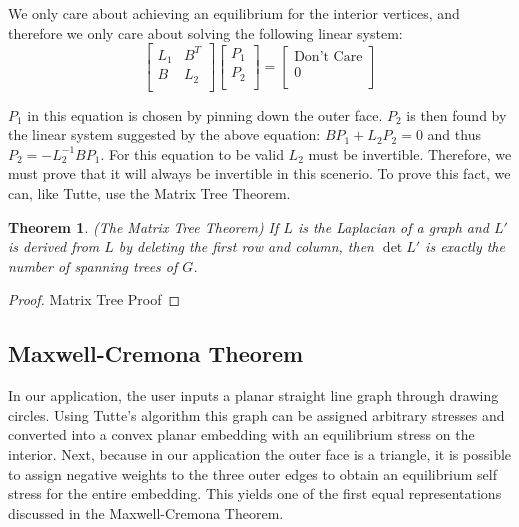 \documentclass[11pt]{article}
\newtheorem{theorem}{Theorem}[section]
\theoremstyle{definition}
\begin{document}
	We only care about achieving an equilibrium for the interior vertices, and therefore we only care about solving the following linear system:
		\begin{equation}
			\begin{bmatrix}
				L_1 & B^T \\
				B & L_2 \\
			\end{bmatrix}
			\begin{bmatrix}
			 	P_1 \\
    				P_2 \\
			\end{bmatrix}
			=
			\begin{bmatrix}
				\text{Don't Care} \\
				0 \\
			\end{bmatrix}
		\end{equation}
	
	$P_1$ in this equation is chosen by pinning down the outer face.
	$P_2$ is then found by the linear system suggested by the above equation: $BP_1 + L_2P_2 = 0$ and thus $P_2 = -L_2^{-1}BP_1$. 
	For this equation to be valid $L_2$ must be invertible. Therefore, we must prove that it will always be invertible in this scenerio.
	To prove this fact, we can, like Tutte, use the Matrix Tree Theorem.
	
	\begin{theorem}{(The Matrix Tree Theorem)}
		If $L$ is the Laplacian of a graph and $L'$ is derived from $L$ by deleting the first row and column, then $\det L'$ is exactly the number of spanning trees of $G$.
	\end{theorem}
	
	\begin{proof}
	Matrix Tree Proof
	\end{proof}
	
	
	
	
	
	
	
	
\subsection{Maxwell-Cremona Theorem}
In our application, the user inputs a planar straight line graph through drawing circles. Using Tutte's algorithm this graph can be assigned arbitrary stresses and converted into a convex planar embedding with an equilibrium stress on the interior. Next, because in our application the outer face is a triangle, it is possible to assign negative weights to the three outer edges to obtain an equilibrium self stress for the entire embedding. This yields one of the first equal representations discussed in the Maxwell-Cremona Theorem.
\end{document}
